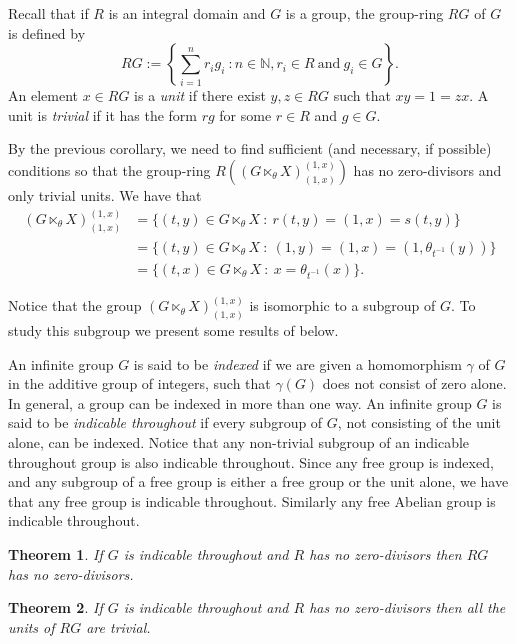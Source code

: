 \documentclass[11pt, a4paper]{amsart}
\newcommand{\N}{\ensuremath {\mathbb{N}} }
\newcommand{\Gx}{\ensuremath {G \ltimes_\theta X}}
\theoremstyle{plain}
\newtheorem{theorem}{Theorem}[section]
\begin{document}
Recall that if $R$ is an integral domain and  $G$ is a group, the group-ring $RG$ of $G$ is defined by 
$$RG := \left\lbrace \sum_{i=1}^n r_ig_i \ : n \in \N, r_i \in R \ \mbox{and} \ g_i \in G \right\rbrace.$$
An element $x \in RG$ is a \emph{unit} if there exist $y, z \in RG$ such that $xy = 1 = zx.$ A unit is \emph{trivial} if it has the form $rg$ for some $r \in R$ and $g \in G.$


By the previous corollary, we need to find sufficient (and necessary, if possible) conditions so that the group-ring $R((\Gx)_{(1,x)}^{(1,x)})$ has no zero-divisors and only trivial units. We have that
\begin{align*}
(\Gx)_{(1,x)}^{(1,x)} & = \{(t,y) \in \Gx \ : \ r(t,y)=(1,x)=s(t,y)\} \\
                      & = \{(t,y) \in \Gx \ : \ (1,y)=(1,x)=(1,\theta_{t^{-1}}(y))\} \\
                      & = \{(t,x) \in \Gx \ : \ x=\theta_{t^{-1}}(x) \}. 
\end{align*}

Notice that the group $(\Gx)_{(1,x)}^{(1,x)}$ is isomorphic to a subgroup of $G.$ To study this subgroup we present some results of \cite{Higman} below.

An infinite group $G$ is said to be \emph{indexed} if we are given a homomorphism $\gamma$ of $G$ in the additive group of integers, such that $\gamma(G)$ does not consist of zero alone. In general, a group can be indexed in more than one way. An infinite group $G$ is said to be \emph{indicable throughout} if every subgroup of $G$, not consisting of the unit alone, can be indexed. Notice that any non-trivial subgroup of an indicable throughout group is also indicable throughout. Since any free group is indexed, and any subgroup of a free group is either a free group or the unit alone, we have that any free group is indicable throughout. Similarly any free Abelian group is indicable throughout.


\begin{theorem}\label{thoRGzerodivisores}
\cite[Theorem~12]{Higman} If $G$ is indicable throughout and $R$ has no zero-divisors then $RG$ has no zero-divisors.
\end{theorem}

\begin{theorem}\label{thoRGunitstrivial}
\cite[Theorem~13]{Higman} If $G$ is indicable throughout and $R$ has no zero-divisors then all the units of $RG$ are trivial.
\end{theorem}
\end{document}
